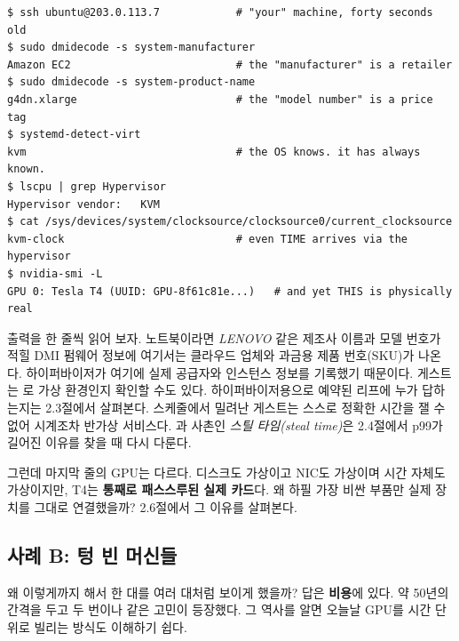 \begin{terminalbox}
\begin{Verbatim}[breaklines=true,breakanywhere=true,fontsize=\small,formatcom=\color{tbbtermfg},codes=\tbbcodeactive]
$ ssh ubuntu@203.0.113.7            # "your" machine, forty seconds old
$ sudo dmidecode -s system-manufacturer
Amazon EC2                          # the "manufacturer" is a retailer
$ sudo dmidecode -s system-product-name
g4dn.xlarge                         # the "model number" is a price tag
$ systemd-detect-virt
kvm                                 # the OS knows. it has always known.
$ lscpu | grep Hypervisor
Hypervisor vendor:   KVM
$ cat /sys/devices/system/clocksource/clocksource0/current_clocksource
kvm-clock                           # even TIME arrives via the hypervisor
$ nvidia-smi -L
GPU 0: Tesla T4 (UUID: GPU-8f61c81e...)   # and yet THIS is physically real
\end{Verbatim}
\end{terminalbox}

출력을 한 줄씩 읽어 보자. 노트북이라면 \textit{LENOVO} 같은 제조사 이름과 모델 번호가 적힐 DMI 펌웨어 정보에 여기서는 클라우드 업체와 과금용 제품 번호(SKU)가 나온다. 하이퍼바이저가 여기에 실제 공급자와 인스턴스 정보를 기록했기 때문이다. 게스트는 로 가상 환경인지 확인할 수도 있다. 하이퍼바이저용으로 예약된  리프에 누가 답하는지는 2.3절에서 살펴본다. 스케줄에서 밀려난 게스트는 스스로 정확한 시간을 잴 수 없어 시계조차 반가상 서비스다. 과 사촌인 \textit{스틸 타임(steal time)}은 2.4절에서 p99가 길어진 이유를 찾을 때 다시 다룬다.

그런데 마지막 줄의 GPU는 다르다. 디스크도 가상이고 NIC도 가상이며 시간 자체도 가상이지만, T4는 \textbf{통째로 패스스루된 실제 카드}다. 왜 하필 가장 비싼 부품만 실제 장치를 그대로 연결했을까? 2.6절에서 그 이유를 살펴본다.

\subsection*{사례 B: 텅 빈 머신들}

왜 이렇게까지 해서 한 대를 여러 대처럼 보이게 했을까? 답은 \textbf{비용}에 있다. 약 50년의 간격을 두고 두 번이나 같은 고민이 등장했다. 그 역사를 알면 오늘날 GPU를 시간 단위로 빌리는 방식도 이해하기 쉽다.

